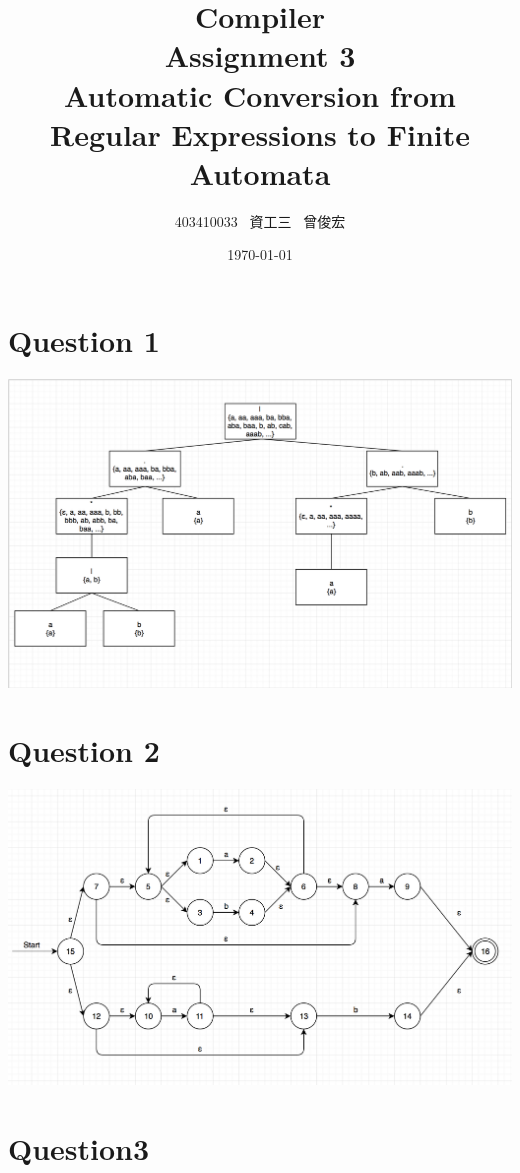 \documentclass[12pt, A4]{article}
\title{Compiler \\ Assignment 3 \\ Automatic Conversion from Regular Expressions to Finite Automata}
\author{403410033 \ 資工三 \ 曾俊宏}
\date{\today}
\begin{document}
	
	\maketitle

	\section{Question 1}
	
	\includegraphics[scale=0.55]{Question1}
	
	\newpage
	
	\section{Question 2}
	
	\includegraphics[scale=0.6]{Question2}
	
	\newpage
	
	\section{Question3}
	
\end{document}
